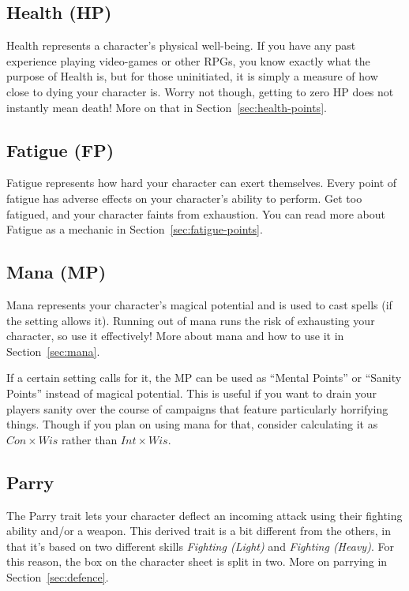 \subsection{Health (HP)}
Health represents a character's physical well-being.
If you have any past experience playing video-games or other RPGs, you know exactly what the purpose of Health is, but for those uninitiated, it is simply a measure of how close to dying your character is.
Worry not though, getting to zero HP does not instantly mean death!
More on that in Section~\ref{sec:health-points}.

\subsection{Fatigue (FP)}
Fatigue represents how hard your character can exert themselves.
Every point of fatigue has adverse effects on your character's ability to perform.
Get too fatigued, and your character faints from exhaustion.
You can read more about Fatigue as a mechanic in Section~\ref{sec:fatigue-points}.

\subsection{Mana (MP)}\label{sec:traits-mp}
Mana represents your character's magical potential and is used to cast spells (if the setting allows it).
Running out of mana runs the risk of exhausting your character, so use it effectively!
More about mana and how to use it in Section~\ref{sec:mana}.

\begin{note} 
    If a certain setting calls for it, the MP can be used as ``Mental Points'' or ``Sanity Points'' instead of magical potential.
    This is useful if you want to drain your players sanity over the course of campaigns that feature particularly horrifying things.
    Though if you plan on using mana for that, consider calculating it as $Con \times Wis$ rather than $Int \times Wis$.
\end{note}

\subsection{Parry}
The Parry trait lets your character deflect an incoming attack using their fighting ability and/or a weapon.
This derived trait is a bit different from the others, in that it's based on two different skills \textit{Fighting (Light)} and \textit{Fighting (Heavy)}.
For this reason, the box on the character sheet is split in two.
More on parrying in Section~\ref{sec:defence}.

